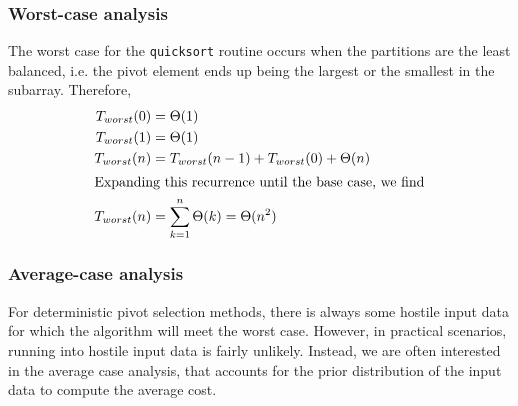 \documentclass[]{finalproject}
\begin{document}
\subsubsection{Worst-case analysis}

The worst case for the \texttt{quicksort} routine occurs when the partitions are the least balanced,
i.e. the pivot element ends up being the largest or the smallest in the subarray. Therefore,
\begin{align*}
T_{worst}(0) &= \Theta(1) \\
T_{worst}(1) &= \Theta(1) \\
T_{worst}(n) &= T_{worst}(n-1) + T_{worst}(0) + \Theta(n) \\
\shortintertext{Expanding this recurrence until the base case, we find}
T_{worst}(n) &= \sum_{k=1}^n\Theta(k) = \Theta(n^2)
\end{align*}

\subsubsection{Average-case analysis}

For deterministic pivot selection methods, there is always some hostile input data for which the algorithm will meet the worst case.
However, in practical scenarios, running into hostile input data is fairly unlikely.
Instead, we are often interested in the average case analysis, that accounts for the prior distribution of the input data to compute the average cost.
\end{document}
